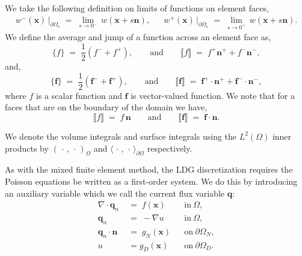 \documentclass[12pt,letterpaper]{article}
\begin{document}
\noindent
We take the following definition on limits of functions on element faces,
\begin{align}
w^{-} (\textbf{x} ) \, \vert_{\partial \Omega_{e} } \; = \; \lim_{s \rightarrow 0^{-}} \, w(\textbf{x}  +  s  \textbf{n}),  && w^{+} (\textbf{x} ) \, \vert_{\partial \Omega_{e} } \; = \; \lim_{s \rightarrow 0^{+}} \, w(\textbf{x}  + s  \textbf{n}).
\end{align} 
\noindent
We define the average and jump of a function across an element face as,
\begin{equation}
\{f\} \; = \; \frac{1}{2}(f^-+f^+), 
\qquad \mbox{and} \qquad 
\llbracket f \rrbracket \; = \; f^+ \textbf{n}^+ + f^- \textbf{n}^-,
\end{equation}
\noindent
and,
\begin{equation}
\{\textbf{f} \} \; = \; \frac{1}{2}(\textbf{f}^- + \textbf{f}^+), 
\qquad \mbox{and}\qquad  
\llbracket \textbf{f} \rrbracket \; = \;\textbf{f}^+ \cdot \textbf{n}^+ + \textbf{f}^- \cdot \textbf{n}^- , 
\end{equation}
\noindent
where $f$ is a scalar function and $\textbf{f}$ is vector-valued function. We note that for a faces that are on the boundary of the domain we have,
\begin{equation}
\llbracket f \rrbracket \; = \; f \,  \textbf{n} 
\qquad \mbox{and}\qquad  
\llbracket \textbf{f} \rrbracket \; = \; \textbf{f} \cdot \textbf{n}.
\end{equation}

\noindent
We denote the volume integrals and surface integrals using the $L^{2}(\Omega)$ inner products by $( \, \cdot \, , \, \cdot \, )_{\Omega}$ and $\langle  \, \cdot \, , \, \cdot \,  \rangle_{\partial \Omega}$ respectively. 
\vspace{2mm}

As with the mixed finite element method, the LDG discretization requires the Poisson equations be written as a first-order system.  We do this by introducing an auxiliary variable which we call the current flux variable $\textbf{q}$:
\begin{align}
\label{eq:Primary}
\nabla \cdot \textbf{q}_{n}
\; &= \; 
f(\textbf{x}) && \text{in} \ \Omega,  \\
\label{eq:Auxillary}
\textbf{q}_{n} 
\; &= \;
 -\nabla u && \text{in} \ \Omega,   \\
\textbf{q}_{n}   \cdot \textbf{n} 
\; &= \; g_{N}(\textbf{x}) && \text{on} \ \partial \Omega_{N},\\
u &= g_{D}(\textbf{x}) && \mbox{on}\ \partial \Omega_{D}.
\end{align}
\end{document}
